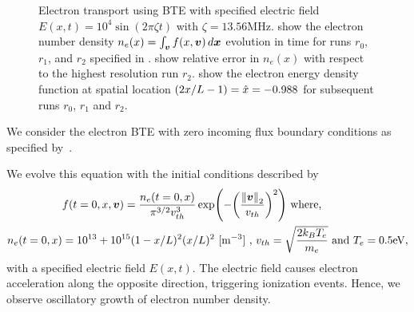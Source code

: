 \begin{figure}[!tbhp]
\begin{center}
	\end{center}
	\caption{Electron transport using BTE with specified electric field $E(x,t)=10^4 \sin(2\pi \zeta t)$ with $\zeta=13.56$MHz.  show the electron number density $n_e(x)=\int_{\vect{v}} f\of{x, \vect{v}}\diff{\vect{x}}$ evolution in time for runs $r_0$, $r_1$, and $r_2$ specified in .  show relative error in $n_e(x)$ with respect to the highest resolution run $r_2$.  show the electron energy density function at spatial location $\of{2x/L-1}=\hat{x} = -0.988$ for subsequent runs $r_0$, $r_1$ and $r_2$.\label{fig:self_convegence_1d_bte_with_E}}
\end{figure}

We consider the electron BTE with zero incoming flux boundary conditions as specified by~.

We evolve this equation with the initial conditions described by
\begin{align}
    &f(t=0, x, \vect{v}) = \frac{n_e\of{t=0, x}}{{\pi}^{3/2}v_{th}^3} \exp\of{-\of{\frac{\norm{\vect{v}}_2}{v_{th}}}^2} \nonumber \text{ where, } \\ 
    n_e\of{t=0, x} &= 10^{13} + 10^{15} (1- x / L)^2 (x/L)^2 \ [\text{m}^{-3}] \text { ,  } v_{th} = \sqrt{\frac{2k_B T_e}{m_e}} \text{ and } T_e = 0.5 \text{eV}\label{eq:ic_liu},
\end{align} with a specified electric field $E(x,t)$. The electric field causes electron acceleration along the opposite direction, triggering ionization events. Hence, we observe oscillatory growth of electron number density. 

